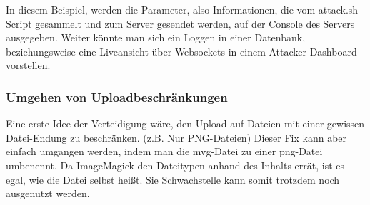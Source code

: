 In diesem Beispiel, werden die Parameter, also Informationen,
die vom attack.sh Script gesammelt und zum Server gesendet werden, auf der Console des Servers ausgegeben.
Weiter könnte man sich ein Loggen in einer Datenbank,
beziehungsweise eine Liveansicht über Websockets in einem Attacker-Dashboard vorstellen.

\subsubsection{Umgehen von Uploadbeschränkungen}

Eine erste Idee der Verteidigung wäre, den Upload auf Dateien mit einer gewissen Datei-Endung zu beschränken.
(z.B. Nur PNG-Dateien)
Dieser Fix kann aber einfach umgangen werden, indem man die mvg-Datei zu einer png-Datei umbenennt.
Da ImageMagick den Dateitypen anhand des Inhalts errät, ist es egal, wie die Datei selbst heißt.
Sie Schwachstelle kann somit trotzdem noch ausgenutzt werden.